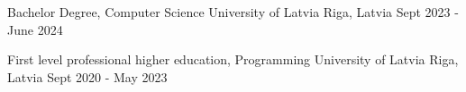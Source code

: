 

\begin{cventries}

  \cventry
    {Bachelor Degree, Computer Science} %
    {University of Latvia} %
    {Riga, Latvia} %
    {Sept 2023 - June 2024} %
    {
      \begin{cvitems} %
      \end{cvitems}
    }
    
  \cventry
    {First level professional higher education, Programming} %
    {University of Latvia} %
    {Riga, Latvia} %
    {Sept 2020 - May 2023} %
    {
      \begin{cvitems} %
      \end{cvitems}
    }
\end{cventries}
